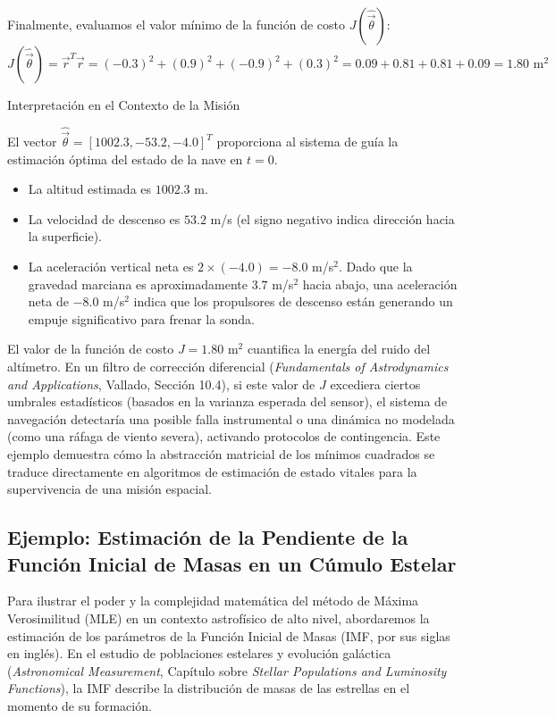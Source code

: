 Finalmente, evaluamos el valor mínimo de la función de costo $J(\hat{\vec{\theta}})$:
$$ J(\hat{\vec{\theta}}) = \vec{r}^T \vec{r} = (-0.3)^2 + (0.9)^2 + (-0.9)^2 + (0.3)^2 = 0.09 + 0.81 + 0.81 + 0.09 = 1.80 \text{ m}^2 $$

Interpretación en el Contexto de la Misión

El vector $\hat{\vec{\theta}} = [1002.3, -53.2, -4.0]^T$ proporciona al sistema de guía la estimación óptima del estado de la nave en $t=0$. 
\begin{itemize}
    \item La altitud estimada es $1002.3$ m.
    \item La velocidad de descenso es $53.2$ m/s (el signo negativo indica dirección hacia la superficie).
    \item La aceleración vertical neta es $2 \times (-4.0) = -8.0$ m/s$^2$. Dado que la gravedad marciana es aproximadamente $3.7$ m/s$^2$ hacia abajo, una aceleración neta de $-8.0$ m/s$^2$ indica que los propulsores de descenso están generando un empuje significativo para frenar la sonda.
\end{itemize}

El valor de la función de costo $J = 1.80 \text{ m}^2$ cuantifica la energía del ruido del altímetro. En un filtro de corrección diferencial (\textit{Fundamentals of Astrodynamics and Applications}, Vallado, Sección 10.4), si este valor de $J$ excediera ciertos umbrales estadísticos (basados en la varianza esperada del sensor), el sistema de navegación detectaría una posible falla instrumental o una dinámica no modelada (como una ráfaga de viento severa), activando protocolos de contingencia. Este ejemplo demuestra cómo la abstracción matricial de los mínimos cuadrados se traduce directamente en algoritmos de estimación de estado vitales para la supervivencia de una misión espacial.


\subsection{Ejemplo: Estimación de la Pendiente de la Función Inicial de Masas en un Cúmulo Estelar}

Para ilustrar el poder y la complejidad matemática del método de Máxima Verosimilitud (MLE) en un contexto astrofísico de alto nivel, abordaremos la estimación de los parámetros de la Función Inicial de Masas (IMF, por sus siglas en inglés). En el estudio de poblaciones estelares y evolución galáctica (\textit{Astronomical Measurement}, Capítulo sobre \textit{Stellar Populations and Luminosity Functions}), la IMF describe la distribución de masas de las estrellas en el momento de su formación. 

